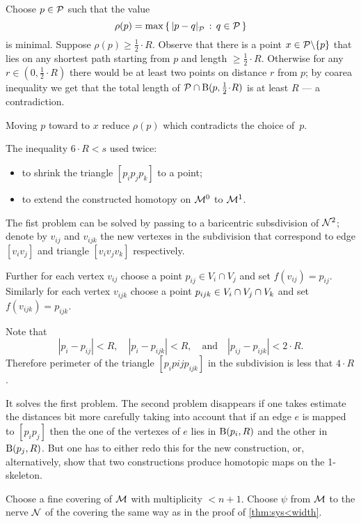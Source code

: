 Choose $p\in\mathcal{P}$ such that the value
\[\rho(p)=\max\set{\dist{p}{q}{\spc{P}}}{q\in\spc{P}}\]
is minimal.
Suppose $\rho(p)\ge\tfrac 12\cdot R$.
Observe that there is a point $x\z\in \spc{P}\backslash\{p\}$ that lies on any shortest path starting from $p$ and length $\ge\tfrac 12\cdot R$.
Otherwise for any $r\in(0,\tfrac 12\cdot R)$ there would be at least two points on distance $r$ from $p$;
by coarea inequality we get that the total length of $\spc{P}\cap \oBall(p,\tfrac 12\cdot R)$ is at least $R$ --- a contradiction.

Moving $p$ toward to $x$ reduce $\rho(p)$ which contradicts the choice of~$p$.

The inequality $6\cdot R<s$ used twice:
\begin{itemize}
\item to shrink the triangle $[p_ip_jp_k]$ to a point;
\item to extend the constructed homotopy on $\mathcal{M}^0$ to $\mathcal{M}^1$.
\end{itemize}

The fist problem can be solved by passing to a baricentric subsdivision of $\mathcal{N}^2$;
denote by $v_{ij}$ and $v_{ijk}$ the new vertexes in the subdivision that correspond to edge $[v_iv_j]$ and triangle $[v_iv_jv_k]$ respectively.

Further for each vertex $v_{ij}$ choose a point $p_{ij}\in V_i\cap V_j$ and set $f(v_{ij})=p_{ij}$.
Similarly for each vertex $v_{ijk}$ choose a point $p_{ijk}\z\in V_i\cap V_j\cap V_k$ and set $f(v_{ijk})=p_{ijk}$.

Note that 
\[|p_i-p_{ij}|<R,\quad |p_i-p_{ijk}|<R,\quad\text{and}\quad |p_{ij}-p_{ijk}|<2\cdot R.\]
Therefore perimeter of the triangle $[p_ip{ij}p_{ijk}]$ in the subdivision is less that $4\cdot R$.

It solves the first problem.
The second problem disappears if one takes estimate the distances bit more carefully taking into account that if an edge $e$ is mapped to $[p_ip_j]$ then the one of the vertexes of $e$ lies in $\mathrm{B}{}(p_i,R)$ and the other in  $\mathrm{B}{}(p_j,R)$.
But one has to either redo this for the new construction, or, alternatively, show that two constructions produce homotopic maps on the 1-skeleton. 
 
Choose a fine covering of $\mathcal{M}$ with multiplicity $<n+1$.
Choose $\psi$ from $\mathcal{M}$ to the nerve $\mathcal{N}$ of the covering the same way as in the proof of \ref{thm:sys<width}.

